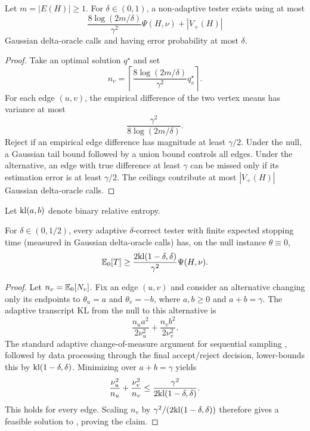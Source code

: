 \begin{theorem}
\label{thm:upper}
Let $m=|E(H)|\ge1$.  For $\delta\in(0,1)$, a non-adaptive tester exists using at
most
\[
\frac{8\log(2m/\delta)}{\gamma^2}\Psi(H,\nu)+|V_+(H)|
\]
Gaussian delta-oracle calls and having error probability at most $\delta$.
\end{theorem}

\begin{proof}
Take an optimal solution $q^\star$ and set
\[
n_v=\left\lceil
\frac{8\log(2m/\delta)}{\gamma^2}q_v^\star
\right\rceil.
\]
For each edge $(u,v)$, the empirical difference of the two vertex means has
variance at most
\[
\frac{\gamma^2}{8\log(2m/\delta)}.
\]
Reject if an empirical edge
difference has magnitude at least $\gamma/2$.  Under the null, a Gaussian tail
bound followed by a union bound controls all edges.  Under the alternative, an
edge with true difference at least $\gamma$ can be missed only if its estimation
error is at least $\gamma/2$.  The ceilings contribute at most $|V_+(H)|$
Gaussian delta-oracle calls.
\end{proof}

Let $\mathrm{kl}(a,b)$ denote binary relative entropy.

\begin{theorem}
\label{thm:lower}
For $\delta\in(0,1/2)$, every adaptive $\delta$-correct tester with finite
expected stopping time (measured in Gaussian delta-oracle calls) has, on the null instance $\theta\equiv0$,
\[
\mathbb{E}_0[T]
\ge
\frac{2\mathrm{kl}(1-\delta,\delta)}{\gamma^2}\Psi(H,\nu).
\]
\end{theorem}

\begin{proof}
Let $n_v=\mathbb{E}_0[N_v]$.  Fix an edge $(u,v)$ and consider an alternative changing
only its endpoints to $\theta_u=a$ and $\theta_v=-b$, where $a,b\ge0$ and
$a+b=\gamma$.  The adaptive transcript KL from the null to this alternative is
\[
\frac{n_u a^2}{2\nu_u^2}+\frac{n_v b^2}{2\nu_v^2}.
\]
The standard adaptive change-of-measure argument for sequential sampling
\cite{Chernoff1959,CohenZhao2015}, followed by data processing through the final
accept/reject decision, lower-bounds this by $\mathrm{kl}(1-\delta,\delta)$.  Minimizing over $a+b=\gamma$ yields
\[
\frac{\nu_u^2}{n_u}+\frac{\nu_v^2}{n_v}
\le
\frac{\gamma^2}{2\mathrm{kl}(1-\delta,\delta)}.
\]
This holds for every edge.  Scaling $n_v$ by
$\gamma^2/(2\mathrm{kl}(1-\delta,\delta))$ therefore gives a feasible solution to
, proving the claim.
\end{proof}

